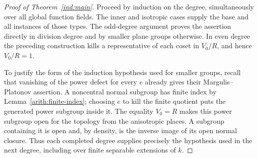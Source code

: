 \begin{proof}[Proof of Theorem~\ref{ind:main}]
Proceed by induction on the degree, simultaneously over all global
function fields.  The inner and isotropic cases supply the base and
all instances of those types.  The odd-degree argument proves the
assertion directly in division degree and by smaller plane groups
otherwise.  In even degree the preceding construction kills a
representative of each coset in $V_0/R$, and hence $V_0/R=1$.

To justify the form of the induction hypothesis used for smaller
groups, recall that vanishing of the power defect for every $e$
already gives their Margulis--Platonov assertion.  A noncentral normal
subgroup has finite index by Lemma~\ref{arith:finite-index};
choosing $e$ to kill the finite quotient puts the generated power
subgroup inside it.  The equality $V_0=R$ makes this power subgroup
open for the topology from the anisotropic places.  A subgroup
containing it is open and, by density, is the inverse image of its
open normal closure.  Thus each completed degree supplies precisely
the hypothesis used in the next degree, including over finite
separable extensions of $k$.
\end{proof}
